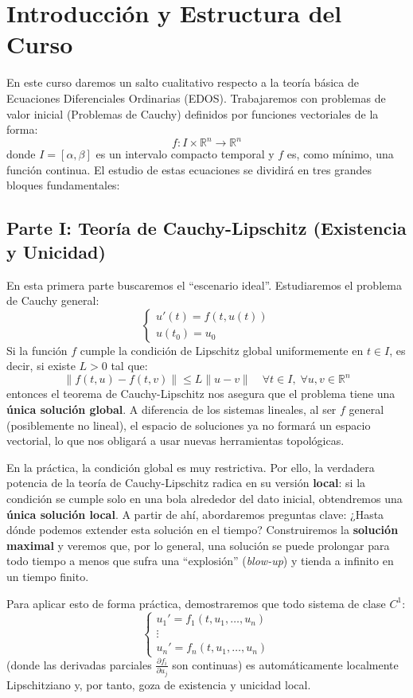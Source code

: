 \section*{Introducción y Estructura del Curso}

En este curso daremos un salto cualitativo respecto a la teoría básica de Ecuaciones Diferenciales Ordinarias (EDOS). Trabajaremos con problemas de valor inicial (Problemas de Cauchy) definidos por funciones vectoriales de la forma:
\[
    f : I \times \mathbb{R}^n \to \mathbb{R}^n
\]
donde $I = [\alpha, \beta]$ es un intervalo compacto temporal y $f$ es, como mínimo, una función continua. El estudio de estas ecuaciones se dividirá en tres grandes bloques fundamentales:

\subsection*{Parte I: Teoría de Cauchy-Lipschitz (Existencia y Unicidad)}
En esta primera parte buscaremos el ``escenario ideal''. Estudiaremos el problema de Cauchy general:
\[
    \begin{cases}
        u'(t) = f(t, u(t)) \\
        u(t_0) = u_0
    \end{cases}
\]
Si la función $f$ cumple la condición de Lipschitz global uniformemente en $t \in I$, es decir, si existe $L > 0$ tal que:
\[
    \| f(t, u) - f(t, v) \| \leq L \| u - v \| \quad \forall t \in I, \; \forall u, v \in \mathbb{R}^n
\]
entonces el teorema de Cauchy-Lipschitz nos asegura que el problema tiene una \textbf{única solución global}. A diferencia de los sistemas lineales, al ser $f$ general (posiblemente no lineal), el espacio de soluciones ya no formará un espacio vectorial, lo que nos obligará a usar nuevas herramientas topológicas.

En la práctica, la condición global es muy restrictiva. Por ello, la verdadera potencia de la teoría de Cauchy-Lipschitz radica en su versión \textbf{local}: si la condición se cumple solo en una bola alrededor del dato inicial, obtendremos una \textbf{única solución local}. A partir de ahí, abordaremos preguntas clave: ¿Hasta dónde podemos extender esta solución en el tiempo? Construiremos la \textbf{solución maximal} y veremos que, por lo general, una solución se puede prolongar para todo tiempo a menos que sufra una ``explosión'' (\textit{blow-up}) y tienda a infinito en un tiempo finito.

Para aplicar esto de forma práctica, demostraremos que todo sistema de clase $C^1$:
\[
    \begin{cases}
        u_1' = f_1(t, u_1, \ldots, u_n) \\
        \vdots \\
        u_n' = f_n(t, u_1, \ldots, u_n)
    \end{cases}
\]
(donde las derivadas parciales $\frac{\partial f_i}{\partial u_j}$ son continuas) es automáticamente localmente Lipschitziano y, por tanto, goza de existencia y unicidad local.

